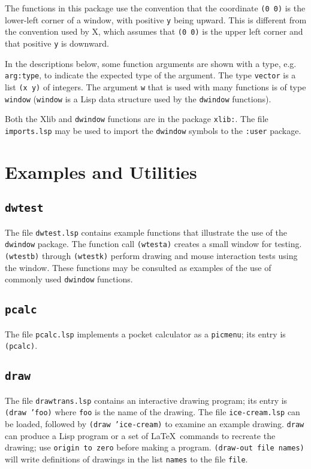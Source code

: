 The functions in this package use the convention that the coordinate
{\tt (0 0)} is the lower-left corner of a window, with positive {\tt y}
being upward.  This is different from the convention used by
X, which assumes that {\tt (0 0)} is the upper left corner and
that positive {\tt y} is downward.

In the descriptions below, some function arguments are shown with a type,
e.g. {\tt arg:type}, to indicate the expected type of the argument.
The type {\tt vector} is a list {\tt (x y)} of integers.  The argument
{\tt w} that is used with many functions is of type {\tt window}
({\tt window} is a Lisp data structure used by the {\tt dwindow} functions).

Both the Xlib and {\tt dwindow} functions are in the package {\tt xlib:}.
The file {\tt imports.lsp} may be used to import the {\tt dwindow} symbols
to the {\tt :user} package.


\section{Examples and Utilities}

\subsection{{\tt dwtest}}

The file {\tt dwtest.lsp} contains example functions that illustrate
the use of the {\tt dwindow} package.  The function call {\tt (wtesta)}
creates a small window for testing.  {\tt (wtestb)} through
{\tt (wtestk)} perform drawing and mouse interaction tests using the
window.  These functions may be consulted as examples of the use of
commonly used {\tt dwindow} functions.

\subsection{{\tt pcalc}}

The file {\tt pcalc.lsp} implements
a pocket calculator as a {\tt picmenu}; its entry is {\tt (pcalc)}.

\subsection{{\tt draw}}

The file {\tt drawtrans.lsp} contains an interactive drawing program;
its entry is {\tt (draw 'foo)} where {\tt foo} is the name of the drawing.
The file {\tt ice-cream.lsp} can be loaded, followed by
{\tt (draw 'ice-cream)} to examine an example drawing.
{\tt draw} can produce a Lisp program or a set of \LaTeX \  commands to
recreate the drawing; use {\tt origin to zero} before making a program.
{\tt (draw-out file names)} will write definitions of drawings in the
list {\tt names} to the file {\tt file}.


